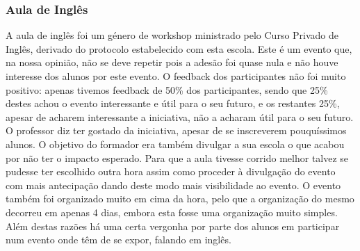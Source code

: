 
\subsubsection{Aula de Inglês}

A aula de inglês foi um género de workshop ministrado pelo Curso Privado de Inglês, derivado do protocolo estabelecido com esta escola. Este é um evento que, na nossa opinião, não se deve repetir pois a adesão foi quase nula e não houve interesse dos alunos por este evento. O feedback dos participantes não foi muito positivo: apenas tivemos feedback de 50\% dos participantes, sendo que 25\% destes achou o evento interessante e útil para o seu futuro, e os restantes 25\%, apesar de acharem interessante a iniciativa, não a acharam útil para o seu futuro. O professor diz ter gostado da iniciativa, apesar de se inscreverem pouquíssimos alunos. O objetivo do formador era também divulgar a sua escola o que acabou por não ter o impacto esperado. Para que a aula tivesse corrido melhor talvez se pudesse ter escolhido outra hora assim como proceder à divulgação do evento com mais antecipação dando deste modo mais visibilidade ao evento. O evento também foi organizado muito em cima da hora, pelo que a organização do mesmo decorreu em apenas 4 dias, embora esta fosse uma organização muito simples. Além destas razões há uma certa vergonha por parte dos alunos em participar num evento onde têm de se expor, falando em inglês.
